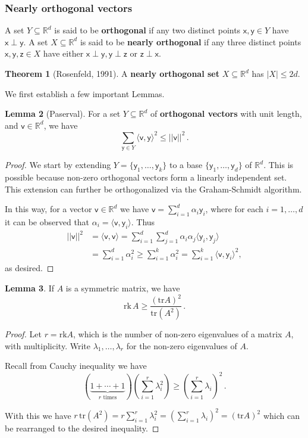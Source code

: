 \documentclass[12pt]{amsart}
\theoremstyle{definition}
\newtheorem{thm}{Theorem}[section]
\newtheorem{lm}[thm]{Lemma}
\newcommand{\R}{\mathbb{R}}
\newcommand{\vv}{\mathsf{v}}
\newcommand{\vx}{\mathsf{x}}
\newcommand{\vy}{\mathsf{y}}
\newcommand{\vz}{\mathsf{z}}
\newcommand{\rk}{\mathrm{rk}}
\newcommand{\tr}{\mathrm{tr}}
\begin{document}
\subsubsection*{Nearly orthogonal vectors}

A set $Y \subseteq \R^d$ is said to be \textbf{orthogonal} if any two distinct points $\vx, \vy \in Y$ have $\vx \perp \vy$.
A set $X\subseteq \R^d$ is said to be \textbf{nearly orthogonal} if any three distinct points $\vx, \vy, \vz \in X $ have either $\vx\perp \vy, \vy\perp\vz$ or $\vz\perp\vx$.


\begin{thm}[Rosenfeld, 1991]\label{thm:nearly}
A \textbf{nearly orthogonal set} $X\subseteq \R^d$ has $|X| \leq 2d$.
\end{thm}

We first establish a few important Lemmas.

\begin{lm}[Paserval]\label{lm:paserval}
For a set $Y \subseteq \R^d$ of \textbf{orthogonal vectors} with unit length, and $\vv \in \R^d$, we have 
$$ \sum_{\vy \in Y} \langle \vv, \vy\rangle^2 \leq ||\vv ||^2 \, . $$
\end{lm}

\begin{proof}
We start by extending $Y = \{\vy_1, \ldots, \vy_k\}$ to a base $\{\vy_1, \ldots, \vy_d\}$ of $\R^d$.
This is possible because non-zero orthogonal vectors form a linearly independent set. 
This extension can further be orthogonalized via the Graham-Schmidt algorithm.

In this way, for a vector $\vv\in \R^d$ we have $\vv = \sum_{i=1}^d \alpha_i \vy_i$, where for each $i=1, \ldots, d$ it can be observed that $\alpha_i = \langle \vv, \vy_i\rangle$.
Thus 
\begin{align*}
|| \vv ||^2 &= \langle \vv, \vv \rangle  = \sum_{i=1}^d \sum_{j=1}^d \alpha_i \alpha_j  \langle \vy_i,  \vy_j \rangle \\ 
&= \sum_{i=1}^d \alpha_i^2 \geq \sum_{i=1}^k \alpha_i^2 = \sum_{i=1}^k \langle \vv, \vy_i\rangle^2,
\end{align*}
as desired.
\end{proof}


\begin{lm}\label{lm:rank_ineq}
If $A$ is a symmetric matrix, we have 
$$ \rk \, A \geq \frac{(\tr A)^2}{\tr (A^2)} \,  . $$
\end{lm}

\begin{proof}
Let $r = \rk A$, which is the number of non-zero eigenvalues of a matrix $A$, with multiplicity.
Write $\lambda_1, \ldots, \lambda_r$ for the non-zero eigenvalues of $A$.

Recall from Cauchy inequality we have
$$\left( \underbrace{1 + \cdots + 1}_{r \text{ times}} \right)\left(\sum_{i=1}^r \lambda_i^2 \right) \geq \left( \sum_{i=1}^r \lambda_i \right)^2\, . $$

With this we have $ r \, \tr (A^2) = r \sum_{i=1}^r \lambda_i^2 =  \left( \sum_{i=1}^r \lambda_i \right)^2 = (\tr A)^2 $ which can be rearranged to the desired inequality.
\end{proof}
\end{document}
